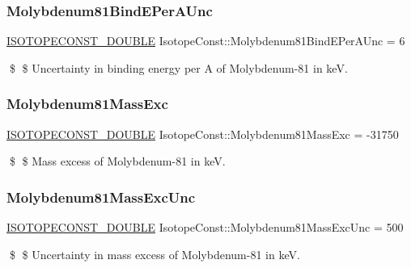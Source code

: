 \subsubsection{\texorpdfstring{Molybdenum81\+Bind\+E\+Per\+A\+Unc}{Molybdenum81BindEPerAUnc}}
{\footnotesize\ttfamily \mbox{\hyperlink{group___isotope_const-_macros_ga8f45a7272ce02c0b4c65c44636ed719a}{I\+S\+O\+T\+O\+P\+E\+C\+O\+N\+S\+T\+\_\+\+D\+O\+U\+B\+LE}} Isotope\+Const\+::\+Molybdenum81\+Bind\+E\+Per\+A\+Unc = 6}

\$ \$ Uncertainty in binding energy per A of Molybdenum-\/81 in keV. \mbox{\label{group___isotope_const-_molybdenum-_mo81_ga702867be09e2e830d7c9308e328e4dbc}} 
\subsubsection{\texorpdfstring{Molybdenum81\+Mass\+Exc}{Molybdenum81MassExc}}
{\footnotesize\ttfamily \mbox{\hyperlink{group___isotope_const-_macros_ga8f45a7272ce02c0b4c65c44636ed719a}{I\+S\+O\+T\+O\+P\+E\+C\+O\+N\+S\+T\+\_\+\+D\+O\+U\+B\+LE}} Isotope\+Const\+::\+Molybdenum81\+Mass\+Exc = -\/31750}

\$ \$ Mass excess of Molybdenum-\/81 in keV. \mbox{\label{group___isotope_const-_molybdenum-_mo81_ga7ed311345c0ad4761874cea7d732f8a4}} 
\subsubsection{\texorpdfstring{Molybdenum81\+Mass\+Exc\+Unc}{Molybdenum81MassExcUnc}}
{\footnotesize\ttfamily \mbox{\hyperlink{group___isotope_const-_macros_ga8f45a7272ce02c0b4c65c44636ed719a}{I\+S\+O\+T\+O\+P\+E\+C\+O\+N\+S\+T\+\_\+\+D\+O\+U\+B\+LE}} Isotope\+Const\+::\+Molybdenum81\+Mass\+Exc\+Unc = 500}

\$ \$ Uncertainty in mass excess of Molybdenum-\/81 in keV. \mbox{\label{group___isotope_const-_molybdenum-_mo81_ga5fb84016451fdf42049b29a58f6d6f73}} 
